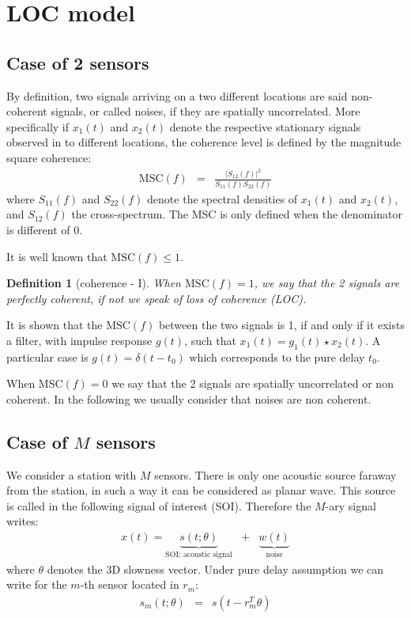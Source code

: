 \documentclass[a4paper, 12pt]{report}
\newtheorem{definition}{Definition}
\def\MSC{\mathrm{MSC}}
\begin{document}
\newpage\clearpage
 \section{LOC model}
\subsection{Case of 2 sensors}
By definition, two signals arriving on a two different locations are said non-coherent signals, or called noises, if they are spatially uncorrelated. More specifically if $x_{1}(t)$ and $x_{2}(t)$ denote the respective stationary signals observed in to different locations, the coherence level is defined by the magnitude square coherence:
\begin{eqnarray*}
 \MSC(f)&=&\frac{|S_{12}(f)|^{2}}{S_{11}(f)S_{22}(f)}
\end{eqnarray*}
where $S_{11}(f)$ and $S_{22}(f)$ denote the spectral densities of $x_{1}(t)$ and $x_{2}(t)$, and $S_{12}(f)$ the cross-spectrum. 
The MSC is only defined when the denominator is different of 0.

It is well known that $\MSC(f)\leq 1$. 
\begin{definition}[coherence - I]
\label{def:coherence2sensors}
When $\MSC(f)=1$, we say that the 2 signals are perfectly coherent, if not we speak of loss of coherence (LOC). 
\end{definition}


It is shown that the  $\MSC(f)$ between the two signals is 1, if and only if it exists a filter, with impulse response $g(t)$, such that $x_{1}(t)=g_{1}(t)\star x_{2}(t)$. A particular case is $g(t)=\delta(t-t_{0})$ which corresponds to the pure delay $t_{0}$.


  \medskip
 When $\MSC(f)=0$ we say that the 2 signals are spatially uncorrelated or non coherent. In the following we usually consider that noises are non coherent.



\subsection{Case of $M$ sensors}
We consider a station with $M$ sensors. There is only one acoustic source faraway from the station, in such a way it can be considered as planar wave. This source is called in the following signal of interest (SOI). Therefore the $M$-ary signal  writes: 
\begin{eqnarray*}
x(t)  =  \underbrace{s(t;\theta)}_{\text{SOI: acoustic signal}} &+& \underbrace{w(t)}_{\text{noise}}
\end{eqnarray*}
where $\theta$ denotes the 3D slowness vector. Under  pure delay assumption we can write for the $m$-th sensor located in $r_{m}$:
\begin{eqnarray}
\label{eq:mthentryofst}
s_{m}(t;\theta)&=&s(t-r_{m}^{T}\theta)
\end{eqnarray}
\end{document}
